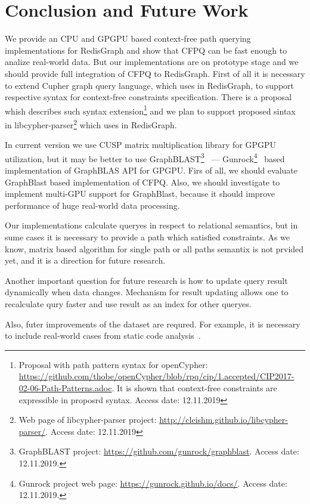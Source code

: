 \section{Conclusion and Future Work}

We provide an CPU and GPGPU based context-free path querying implementations for RedisGraph and show that CFPQ can be fast enough to analize real-world data.
But our implementations are on prototype stage and we should provide full integration of CFPQ to RedisGraph. 
First of all it is necessary to extend Cupher graph query language, which uses in RedisGraph, to support respective syntax for context-free constraints specification.
There is a proposal whish describes such syntax extension\footnote{Proposal with path pattern syntax for openCypher: \url{https://github.com/thobe/openCypher/blob/rpq/cip/1.accepted/CIP2017-02-06-Path-Patterns.adoc}. It is shown that context-free constraints are expressible in proposrd syntax. Access date: 12.11.2019} and we plan to support proposed sintax in libcypher-parser\footnote{Web page of libcypher-parser project: \url{http://cleishm.github.io/libcypher-parser/}. Access date: 12.11.2019} which uses in RedisGraph.

In current version we use CUSP matrix multiplication library for GPGPU utilization, but it may be better to use GraphBLAST\footnote{GraphBLAST project: \url{https://github.com/gunrock/graphblast}. Access date: 12.11.2019.}~\cite{yang2019graphblast} --- Gunrock\footnote{Gunrock project web page: \url{https://gunrock.github.io/docs/}. Access date: 12.11.2019.}~\cite{Wang:2017:GGG:3131890.3108140} based implementation of GraphBLAS API for GPGPU.
Firs of all, we should evaluate GraphBlast based implementation of CFPQ. 
Also, we should investigate to implement multi-GPU support for GraphBlast, because it should improve performance of huge real-world data processing.

Our implementations calculate queryes in respect to relational semantics, but in sume cases it is necessary to provide a path which satisfied constraints.
As we know, matrix based algorithm for single path or all paths semantix is not prvided yet, and it is a direction for future research.

Another important question for future research is how to update query result dynamically when data changes. 
Mechanism for result updating allows one to recalculate qury faster and use result as an index for other queryes.

Also, futer improvements of the dataset are requred.
For example, it is necessary to include real-world cases from static code analysis~\cite{!!!}.